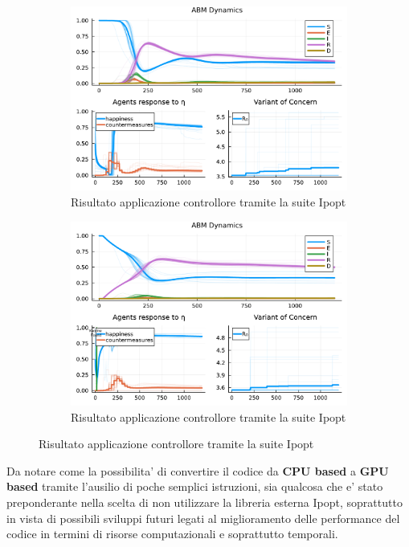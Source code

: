 \begin{figure}[!hb]
	\centering
	\begin{subfigure}[b]{\textwidth}
		\centering
		\includegraphics[width=\textwidth]{img/SocialNetworkABM_IPOPT_CONTROL.pdf}
		\caption{Risultato applicazione controllore tramite la suite Ipopt}
		\label{fig:ipopt_res1}
	\end{subfigure}
	\hfill
	\begin{subfigure}[b]{\textwidth}
		\centering
		\includegraphics[width=\textwidth]{img/SocialNetworkABM_IPOPT_ALL.pdf}
		\caption{Risultato applicazione controllore tramite la suite Ipopt}
		\label{fig:ipopt_res2}
	\end{subfigure}
\end{figure}

Da notare come la possibilita' di convertire il codice da \textbf{CPU based} a \textbf{GPU based} tramite
l'ausilio di poche semplici istruzioni, sia qualcosa che e' stato preponderante nella scelta di non 
utilizzare la libreria esterna Ipopt, soprattutto in vista di possibili sviluppi futuri legati al miglioramento 
delle performance del codice in termini di risorse computazionali e soprattutto temporali.

